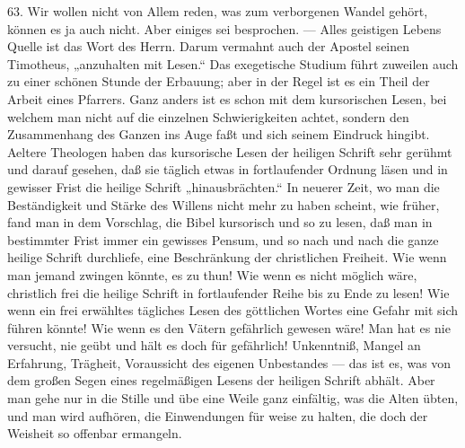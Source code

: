 63. Wir wollen nicht von Allem reden, was zum verborgenen Wandel gehört, können es ja auch nicht. Aber einiges sei besprochen. — Alles geistigen Lebens Quelle ist das Wort des Herrn. Darum vermahnt auch der Apostel seinen Timotheus, „anzuhalten mit Lesen.“ Das exegetische Studium führt zuweilen auch zu einer schönen Stunde der Erbauung; aber in der Regel ist es ein Theil der
Arbeit eines Pfarrers. Ganz anders ist es schon mit dem kursorischen Lesen, bei welchem man nicht auf die einzelnen Schwierigkeiten achtet, sondern den Zusammenhang des Ganzen ins Auge faßt und sich seinem Eindruck hingibt. Aeltere Theologen haben das kursorische Lesen der heiligen Schrift sehr gerühmt und darauf gesehen, daß sie täglich etwas in fortlaufender Ordnung läsen und in gewisser Frist die heilige Schrift „hinausbrächten.“ In neuerer Zeit, wo man die Beständigkeit und Stärke des Willens nicht mehr zu haben scheint, wie früher, fand man in dem Vorschlag, die Bibel kursorisch und so zu lesen, daß man in bestimmter Frist immer ein gewisses Pensum, und so nach und nach die ganze heilige Schrift durchliefe, eine Beschränkung der christlichen Freiheit. Wie wenn man jemand zwingen könnte, es zu thun! Wie wenn es nicht möglich wäre, christlich frei die heilige Schrift in fortlaufender Reihe bis zu Ende zu lesen! Wie wenn ein frei erwähltes tägliches Lesen des göttlichen Wortes eine Gefahr mit sich führen könnte! Wie wenn es den Vätern gefährlich gewesen wäre! Man hat es nie versucht, nie geübt und hält es doch für gefährlich! Unkenntniß, Mangel an Erfahrung, Trägheit, Voraussicht des eigenen Unbestandes — das ist es, was von dem großen Segen eines regelmäßigen Lesens der heiligen Schrift abhält. Aber man gehe nur in die Stille und übe eine Weile ganz einfältig, was die Alten übten, und man wird aufhören, die Einwendungen für weise zu halten, die doch der Weisheit so offenbar ermangeln.

